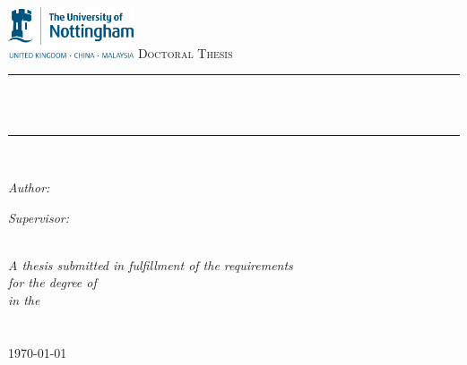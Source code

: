 \documentclass[11pt,a4paper,UKenglish,twoside,openright]{Thesis}
\newcommand{\HRule}{\rule{\linewidth}{0.5mm}} %
\begin{document}
\begin{titlepage}

\begin{center}

\includegraphics[height=1.5cm,scale=0.1]{Pictures/2000px-University_of_Nottingham.png}%
\textsc{\Large Doctoral Thesis}\\[0.5cm] %

\HRule \\[0.4cm] %
{\huge \bfseries \ttitle}\\[0.4cm] %
\HRule \\[1.5cm] %
 
\begin{minipage}{0.4\textwidth}
\begin{flushleft} \large
\emph{Author:}\\
{\authornames} %
\end{flushleft}
\end{minipage}
\begin{minipage}{0.4\textwidth}
\begin{flushright} \large
\emph{Supervisor:} \\
{\supname} %
\end{flushright}
\end{minipage}\\[3cm]
 
\large \textit{A thesis submitted in fulfillment of the requirements\\ for the degree of \degreename}\\[0.3cm] %
\textit{in the}\\[0.4cm]
\groupname\\\deptname\\[2cm] %
 
{\large \today}\\[4cm] %
 
\vfill
\end{center}

\end{titlepage}
\end{document}
